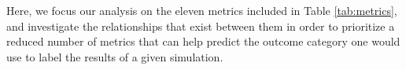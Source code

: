 
Here, we focus our analysis on the eleven metrics included in Table \ref{tab:metrics}, and investigate the relationships that exist between them in order to prioritize a reduced number of metrics that can help predict the outcome category one would use to label the results of a given simulation.
